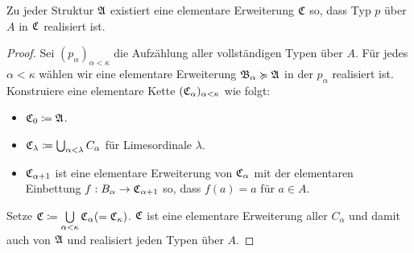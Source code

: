 \begin{satz}
	Zu jeder Struktur $\mathfrak{A}$ existiert eine elementare Erweiterung $\mathfrak{C}$ so, dass Typ $p$ über $A$ in $\mathfrak{C}$ realisiert ist.
\end{satz}
\begin{proof}
	Sei $(p_\alpha)_{\alpha<\kappa}$ die Aufzählung aller vollständigen Typen über $A$. Für jedes $\alpha<\kappa$ wählen wir eine elementare Erweiterung $\mathfrak{B}_\alpha\succcurlyeq\mathfrak{A}$ in der $p_\alpha$ realisiert ist.
	Konstruiere eine elementare Kette $(\mathfrak{C}_\alpha)_{\alpha<\kappa}$ wie folgt:
	\begin{itemize}
		\item $\mathfrak{C}_0\coloneqq\mathfrak{A}$.
		\item $\mathfrak{C}_\lambda\coloneqq\bigcup_{\alpha<\lambda}C_\alpha$ für Limesordinale $\lambda$.
		\item $\mathfrak{C}_{\alpha+1}$ ist eine elementare Erweiterung von $\mathfrak{C}_\alpha$ mit der elementaren Einbettung $f:B_\alpha\to\mathfrak{C}_{\alpha+1}$ so, dass $f(a)=a$ für $a\in A$.
	\end{itemize}
	Setze $\mathfrak{C}\coloneqq\bigcup\limits_{\alpha<\kappa}\mathfrak{C}_\alpha(=\mathfrak{C}_\kappa)$. $\mathfrak{C}$ ist eine elementare Erweiterung aller $C_\alpha$ und damit auch von $\mathfrak{A}$ und realisiert jeden Typen über $A$.
\end{proof}

